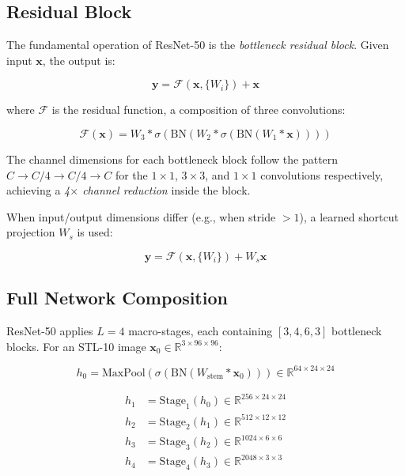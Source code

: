 \documentclass[12pt, a4paper]{article}
\begin{document}
\subsection{Residual Block}

The fundamental operation of ResNet-50 is the \emph{bottleneck residual block}. Given input $\mathbf{x}$, the output is:

\begin{equation}
  \mathbf{y} = \mathcal{F}(\mathbf{x}, \{W_i\}) + \mathbf{x}
  \label{eq:residual}
\end{equation}

where $\mathcal{F}$ is the residual function, a composition of three convolutions:

\begin{equation}
  \mathcal{F}(\mathbf{x}) = W_3 * \sigma\!\left( \text{BN}\!\left( W_2 * \sigma\!\left( \text{BN}( W_1 * \mathbf{x} ) \right) \right) \right)
\end{equation}

The channel dimensions for each bottleneck block follow the pattern $C \to C/4 \to C/4 \to C$ for the $1\!\times\!1$, $3\!\times\!3$, and $1\!\times\!1$ convolutions respectively, achieving a \emph{4$\times$ channel reduction} inside the block.

When input/output dimensions differ (e.g., when stride $> 1$), a learned shortcut projection $W_s$ is used:

\begin{equation}
  \mathbf{y} = \mathcal{F}(\mathbf{x}, \{W_i\}) + W_s \mathbf{x}
\end{equation}

\subsection{Full Network Composition}

ResNet-50 applies $L=4$ macro-stages, each containing $[3, 4, 6, 3]$ bottleneck blocks. For an STL-10 image $\mathbf{x}_0 \in \mathbb{R}^{3 \times 96 \times 96}$:

\begin{equation}
  h_0 = \text{MaxPool}\!\left(\sigma(\text{BN}(W_{\text{stem}} * \mathbf{x}_0))\right) \in \mathbb{R}^{64 \times 24 \times 24}
\end{equation}

\begin{align}
  h_1 &= \text{Stage}_1(h_0) \in \mathbb{R}^{256 \times 24 \times 24} \\
  h_2 &= \text{Stage}_2(h_1) \in \mathbb{R}^{512 \times 12 \times 12} \\
  h_3 &= \text{Stage}_3(h_2) \in \mathbb{R}^{1024 \times 6 \times 6} \\
  h_4 &= \text{Stage}_4(h_3) \in \mathbb{R}^{2048 \times 3 \times 3}
\end{align}
\end{document}
